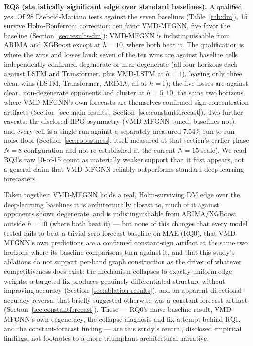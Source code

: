 \documentclass[journal]{IEEEtran}
\begin{document}
\textbf{RQ3 (statistically significant edge over standard baselines).} A qualified yes. Of 28 Diebold-Mariano tests against the seven baselines (Table~\ref{tab:dm}), 15 survive Holm-Bonferroni correction: ten favor VMD-MFGNN, five favor the baseline (Section~\ref{sec:results-dm}); VMD-MFGNN is indistinguishable from ARIMA and XGBoost except at $h=10$, where both beat it. The qualification is where the wins and losses land: seven of the ten wins are against baseline cells independently confirmed degenerate or near-degenerate (all four horizons each against LSTM and Transformer, plus VMD-LSTM at $h=1$), leaving only three clean wins (LSTM, Transformer, ARIMA, all at $h=1$); the five losses are against clean, non-degenerate opponents and cluster at $h=5,10$, the same two horizons where VMD-MFGNN's own forecasts are themselves confirmed sign-concentration artifacts (Section~\ref{sec:main-results}, Section~\ref{sec:constantforecast}). Two further caveats: the disclosed HPO asymmetry (VMD-MFGNN tuned, baselines not), and every cell is a single run against a separately measured 7.54\% run-to-run noise floor (Section~\ref{sec:robustness}, itself measured at that section's earlier-phase $N=8$ configuration and not re-established at the current $N=15$ scale). We read RQ3's raw 10-of-15 count as materially weaker support than it first appears, not a general claim that VMD-MFGNN reliably outperforms standard deep-learning forecasters.

Taken together: VMD-MFGNN holds a real, Holm-surviving DM edge over the deep-learning baselines it is architecturally closest to, much of it against opponents shown degenerate, and is indistinguishable from ARIMA/XGBoost outside $h=10$ (where both beat it) --- but none of this changes that every model tested fails to beat a trivial zero-forecast baseline on MAE (RQ0), that VMD-MFGNN's own predictions are a confirmed constant-sign artifact at the same two horizons where its baseline comparisons turn against it, and that this study's ablations do not support per-band graph construction as the driver of whatever competitiveness does exist: the mechanism collapses to exactly-uniform edge weights, a targeted fix produces genuinely differentiated structure without improving accuracy (Section~\ref{sec:ablation-results}), and an apparent directional-accuracy reversal that briefly suggested otherwise was a constant-forecast artifact (Section~\ref{sec:constantforecast}). These --- RQ0's naive-baseline result, VMD-MFGNN's own degeneracy, the collapse diagnosis and fix attempt behind RQ1, and the constant-forecast finding --- are this study's central, disclosed empirical findings, not footnotes to a more triumphant architectural narrative.
\end{document}
